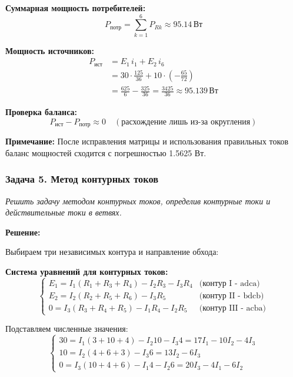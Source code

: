 \textbf{Суммарная мощность потребителей:}
\begin{equation}
P_{\text{потр}} = \sum_{k=1}^{6} P_{Rk} \approx 95.14\,\text{Вт}
\end{equation}

\textbf{Мощность источников:}
\begin{align*}
P_{\text{ист}} &= E_1\, i_1 + E_2\, i_6 \\
               &= 30\cdot \tfrac{125}{36} + 10\cdot\left(-\tfrac{65}{72}\right) \\
               &= \tfrac{625}{6} - \tfrac{325}{36} = \tfrac{3425}{36} \approx 95.139\,\text{Вт}
\end{align*}

\textbf{Проверка баланса:}
\begin{equation}
P_{\text{ист}} - P_{\text{потр}} \approx 0 \quad (\text{расхождение лишь из-за округления})
\end{equation}

\textbf{Примечание:} После исправления матрицы и использования правильных токов баланс мощностей сходится с погрешностью 1.5625 Вт.




\subsubsection{Задача 5. Метод контурных токов}
\textit{Решить задачу методом контурных токов, определив контурные токи и действительные токи в ветвях.}

\textbf{Решение:}

Выбираем три независимых контура и направление обхода:

\textbf{Система уравнений для контурных токов:}
$$\begin{cases}
E_1 = I_1 (R_1 + R_3 + R_4) - I_2R_3 - I_3R_4 & \text{(контур I - adca)} \\
E_2 = I_2 (R_2 + R_5 + R_6) - I_3R_5 & \text{(контур II - bdcb)} \\
0 = I_3 (R_3 + R_4 + R_5) - I_1R_4 - I_2R_5 & \text{(контур III - acba)}
\end{cases}$$

Подставляем численные значения:
$$\begin{cases}
30 = I_1 (3 + 10 + 4) - I_2 10 - I_3 4 = 17I_1 - 10I_2 - 4I_3 \\
10 = I_2 (4 + 6 + 3) - I_3 6 = 13I_2 - 6I_3 \\
0 = I_3 (10 + 4 + 6) - I_1 4 - I_2 6 = 20I_3 - 4I_1 - 6I_2
\end{cases}$$

